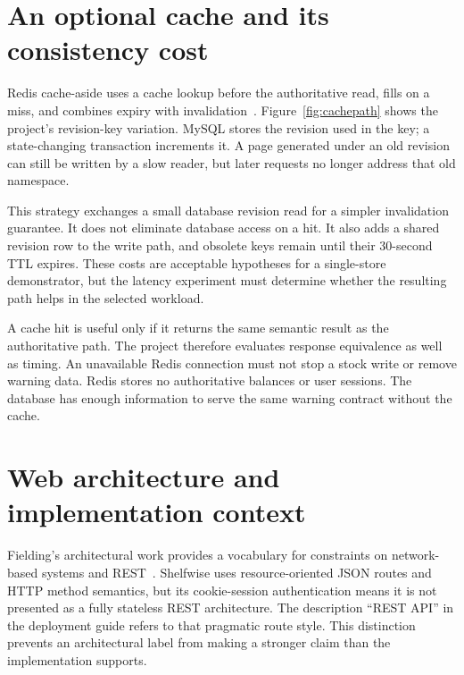 \section{An optional cache and its consistency cost}
Redis cache-aside uses a cache lookup before the authoritative read, fills on a miss, and combines expiry with invalidation~\citep{redis-cache}. Figure~\ref{fig:cachepath} shows the project's revision-key variation. MySQL stores the revision used in the key; a state-changing transaction increments it. A page generated under an old revision can still be written by a slow reader, but later requests no longer address that old namespace.


This strategy exchanges a small database revision read for a simpler invalidation guarantee. It does not eliminate database access on a hit. It also adds a shared revision row to the write path, and obsolete keys remain until their 30-second TTL expires. These costs are acceptable hypotheses for a single-store demonstrator, but the latency experiment must determine whether the resulting path helps in the selected workload.

A cache hit is useful only if it returns the same semantic result as the authoritative path. The project therefore evaluates response equivalence as well as timing. An unavailable Redis connection must not stop a stock write or remove warning data. Redis stores no authoritative balances or user sessions. The database has enough information to serve the same warning contract without the cache.

\section{Web architecture and implementation context}
Fielding's architectural work provides a vocabulary for constraints on network-based systems and REST~\citep{fielding2000}. Shelfwise uses resource-oriented JSON routes and HTTP method semantics, but its cookie-session authentication means it is not presented as a fully stateless REST architecture. The description ``REST API'' in the deployment guide refers to that pragmatic route style. This distinction prevents an architectural label from making a stronger claim than the implementation supports.

